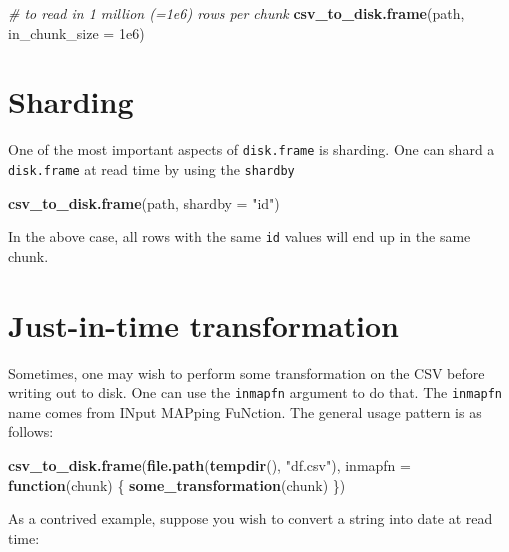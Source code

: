 \documentclass[]{book}
\newenvironment{Shaded}{\begin{snugshade}}{\end{snugshade}}
\newcommand{\CommentTok}[1]{\textcolor[rgb]{0.56,0.35,0.01}{\textit{#1}}}
\newcommand{\ControlFlowTok}[1]{\textcolor[rgb]{0.13,0.29,0.53}{\textbf{#1}}}
\newcommand{\DataTypeTok}[1]{\textcolor[rgb]{0.13,0.29,0.53}{#1}}
\newcommand{\FloatTok}[1]{\textcolor[rgb]{0.00,0.00,0.81}{#1}}
\newcommand{\KeywordTok}[1]{\textcolor[rgb]{0.13,0.29,0.53}{\textbf{#1}}}
\newcommand{\NormalTok}[1]{#1}
\newcommand{\StringTok}[1]{\textcolor[rgb]{0.31,0.60,0.02}{#1}}
\begin{document}
\begin{Shaded}
\begin{Highlighting}[]
\CommentTok{# to read in 1 million (=1e6) rows per chunk}
\KeywordTok{csv_to_disk.frame}\NormalTok{(path, }\DataTypeTok{in_chunk_size =} \FloatTok{1e6}\NormalTok{)}
\end{Highlighting}
\end{Shaded}

\hypertarget{sharding}{%
\section{Sharding}\label{sharding}}

One of the most important aspects of \texttt{disk.frame} is sharding. One can shard a \texttt{disk.frame} at read time by using the \texttt{shardby}

\begin{Shaded}
\begin{Highlighting}[]
\KeywordTok{csv_to_disk.frame}\NormalTok{(path, }\DataTypeTok{shardby =} \StringTok{"id"}\NormalTok{)}
\end{Highlighting}
\end{Shaded}

In the above case, all rows with the same \texttt{id} values will end up in the same chunk.

\hypertarget{just-in-time-transformation}{%
\section{Just-in-time transformation}\label{just-in-time-transformation}}

Sometimes, one may wish to perform some transformation on the CSV before writing out to disk. One can use the \texttt{inmapfn} argument to do that. The \texttt{inmapfn} name comes from INput MAPping FuNction. The general usage pattern is as follows:

\begin{Shaded}
\begin{Highlighting}[]
\KeywordTok{csv_to_disk.frame}\NormalTok{(}\KeywordTok{file.path}\NormalTok{(}\KeywordTok{tempdir}\NormalTok{(), }\StringTok{"df.csv"}\NormalTok{), }\DataTypeTok{inmapfn =} \ControlFlowTok{function}\NormalTok{(chunk) \{}
  \KeywordTok{some_transformation}\NormalTok{(chunk)}
\NormalTok{\})}
\end{Highlighting}
\end{Shaded}

As a contrived example, suppose you wish to convert a string into date at read time:
\end{document}
